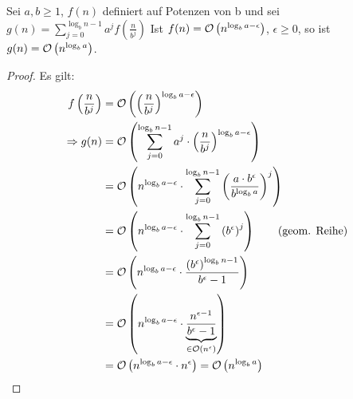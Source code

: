 \begin{lemma}
Sei $a, b \geq 1$, $f(n)$ definiert auf Potenzen von b und sei $g(n) = \sum \limits_{j=0}^{\log_b n -1} a^j f\left(\frac{n}{b^j}\right)$
Ist $f(n) = \mathcal{O}\left(n^{\log_b a - \epsilon}\right)$, $\epsilon \geq 0$, so ist $g(n) = \mathcal{O}\left(n^{\log_b a}\right)$.

\begin{proof}
Es gilt:
\begin{align*}
f\left(\frac{n}{b^j}\right) &= \LO \left(\left(\frac{n}{b^j}\right)^{\log_b a -\epsilon}\right) \\
\Ra g(n) &= \LO \left(\sum \limits_{j = 0}^{\log_b n-1} a^j \cdot \left(\frac{n}{b^j}\right)^{\log_b a - \epsilon} \right) \\
&= \LO \left( n^{\log_b a - \epsilon} 
		\cdot \sum \limits_{j=0}^{\log_b n-1} \left(\frac{a \cdot b^\epsilon}{b^{\log_b a}}\right)^j \right) \\
&= \LO \left( n^{\log_b a - \epsilon} \cdot \sum \limits_{j=0}^{\log_b n-1} \left(b^\epsilon\right)^j \right) \tag{geom. Reihe}\\
&= \LO \left( n^{\log_b a - \epsilon} \cdot \frac{\left(b^\epsilon\right)^{\log_b n -1}}{b^\epsilon -1}\right)\\
&= \LO \left( n^{\log_b a - \epsilon} \cdot \underbrace{\frac{n^{\epsilon -1}}{b^\epsilon -1}}_{ \in\LO( n^\epsilon) }\right)\\ 
&= \LO \left( n^{\log_b a - \epsilon} \cdot n^\epsilon \right) = \LO \left(n^{\log_b a} \right)
\end{align*}    
\end{proof}
\end{lemma}
